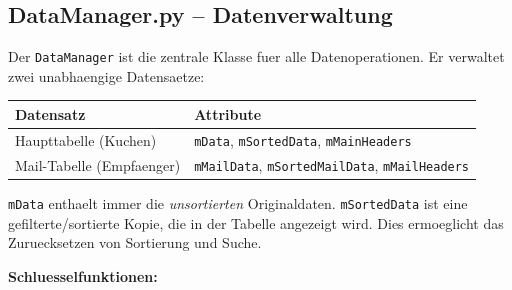 \documentclass[12pt, a4paper]{article}
\begin{document}
\subsection{DataManager.py -- Datenverwaltung}

Der \texttt{DataManager} ist die zentrale Klasse fuer alle Datenoperationen.
Er verwaltet zwei unabhaengige Datensaetze:

\begin{table}[ht!]
\centering
{}
\begin{tabularx}{0.85\textwidth}{lX}
\toprule
\textbf{Datensatz} & \textbf{Attribute} \\
\midrule
Haupttabelle (Kuchen) & \texttt{mData}, \texttt{mSortedData}, \texttt{mMainHeaders} \\
Mail-Tabelle (Empfaenger) & \texttt{mMailData}, \texttt{mSortedMailData}, \texttt{mMailHeaders} \\
\bottomrule
\end{tabularx}
\end{table}

\begin{infobox}
\texttt{mData} enthaelt immer die \emph{unsortierten} Originaldaten.
\texttt{mSortedData} ist eine gefilterte/sortierte Kopie, die in der Tabelle
angezeigt wird. Dies ermoeglicht das Zuruecksetzen von Sortierung und Suche.
\end{infobox}

\textbf{Schluesselfunktionen:}
\end{document}
